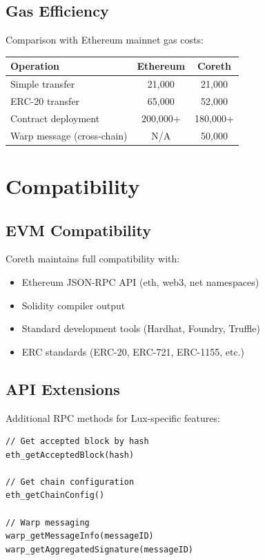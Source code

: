 \documentclass[11pt,letterpaper]{article}
\begin{document}
\subsection{Gas Efficiency}

Comparison with Ethereum mainnet gas costs:

\begin{center}
\begin{tabular}{lcc}
\toprule
\textbf{Operation} & \textbf{Ethereum} & \textbf{Coreth} \\
\midrule
Simple transfer & 21,000 & 21,000 \\
ERC-20 transfer & 65,000 & 52,000 \\
Contract deployment & 200,000+ & 180,000+ \\
Warp message (cross-chain) & N/A & 50,000 \\
\bottomrule
\end{tabular}
\end{center}

\section{Compatibility}

\subsection{EVM Compatibility}

Coreth maintains full compatibility with:

\begin{itemize}
    \item Ethereum JSON-RPC API (eth, web3, net namespaces)
    \item Solidity compiler output
    \item Standard development tools (Hardhat, Foundry, Truffle)
    \item ERC standards (ERC-20, ERC-721, ERC-1155, etc.)
\end{itemize}

\subsection{API Extensions}

Additional RPC methods for Lux-specific features:

\begin{lstlisting}[caption=Extended RPC Methods]
// Get accepted block by hash
eth_getAcceptedBlock(hash)

// Get chain configuration
eth_getChainConfig()

// Warp messaging
warp_getMessageInfo(messageID)
warp_getAggregatedSignature(messageID)
\end{lstlisting}
\end{document}

